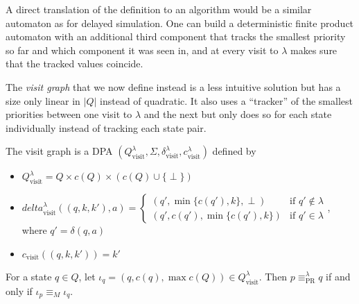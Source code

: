 A direct translation of the definition to an algorithm would be a similar automaton as for delayed simulation. One can build a deterministic finite product automaton with an additional third component that tracks the smallest priority so far and which component it was seen in, and at every visit to $\lambda$ makes sure that the tracked values coincide.

The \emph{visit graph} that we now define instead is a less intuitive solution but has a size only linear in $|Q|$ instead of quadratic. It also uses a \enquote{tracker} of the smallest priorities between one visit to $\lambda$ and the next but only does so for each state individually instead of tracking each state pair.

\begin{definition}
	The visit graph is a DPA $(Q_\text{visit}^\lambda, \Sigma, \delta_\text{visit}^\lambda, c_\text{visit}^\lambda)$ defined by
	\begin{itemize}
		\item $Q_\text{visit}^\lambda = Q \times c(Q) \times (c(Q) \cup \{\perp\})$
		\item $delta_\text{visit}^\lambda((q, k, k'), a) = \begin{cases}
			(q', \min \{c(q'), k\}, \perp) & \text{if } q' \notin \lambda \\
			(q', c(q'), \min \{c(q'), k\}) & \text{if } q' \in \lambda
		\end{cases}$, where $q' = \delta(q, a)$
		\item $c_\text{visit}((q, k, k')) = k'$
	\end{itemize}
\end{definition}

\begin{theorem}
	For a state $q \in Q$, let $\iota_q = (q, c(q), \max c(Q)) \in Q_\text{visit}^\lambda$. Then $p \equiv_\text{PR}^\lambda q$ if and only if $\iota_p \equiv_M \iota_q$.
\end{theorem}

